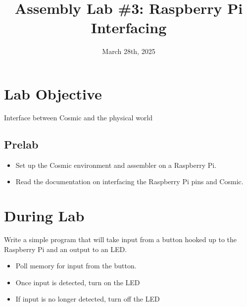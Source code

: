 \documentclass[
	12pt, %
]{fphw}
\title{Assembly Lab \#3: Raspberry Pi Interfacing} %
\date{March 28th, 2025} %
\institute{Elizabethtown College \\ Department of Computer Science} %
\begin{document}
\maketitle %


\section*{Lab Objective}

\begin{problem}
	Interface between Cosmic and the physical world 
\end{problem}


\subsection*{Prelab}

\begin{itemize}
  \item Set up the Cosmic environment and assembler on a Raspberry Pi.
  \item Read the documentation on interfacing the Raspberry Pi pins and Cosmic.
\end{itemize}


\section*{During Lab}

\begin{problem}
	Write a simple program that will take input from a button hooked up to the Raspberry Pi and an output to an LED. 
\end{problem}


\begin{itemize}
  \item Poll memory for input from the button.
  \item Once input is detected, turn on the LED
  \item If input is no longer detected, turn off the LED
\end{itemize}
\end{document}
